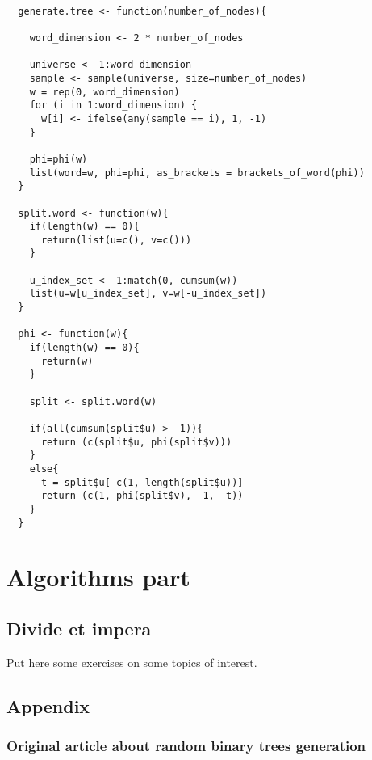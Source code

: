 \documentclass[twoside,openright,titlepage,fleqn,
	headinclude,11pt,a4paper,BCOR5mm,footinclude
	]{scrbook}
\begin{document}
\begin{lstlisting}

  generate.tree <- function(number_of_nodes){

    word_dimension <- 2 * number_of_nodes
    
    universe <- 1:word_dimension
    sample <- sample(universe, size=number_of_nodes)
    w = rep(0, word_dimension)
    for (i in 1:word_dimension) {
      w[i] <- ifelse(any(sample == i), 1, -1)
    }
    
    phi=phi(w)
    list(word=w, phi=phi, as_brackets = brackets_of_word(phi))
  }

  split.word <- function(w){
    if(length(w) == 0){
      return(list(u=c(), v=c()))
    }
    
    u_index_set <- 1:match(0, cumsum(w))
    list(u=w[u_index_set], v=w[-u_index_set])
  }

  phi <- function(w){
    if(length(w) == 0){
      return(w)
    }
    
    split <- split.word(w) 
    
    if(all(cumsum(split$u) > -1)){
      return (c(split$u, phi(split$v)))
    }
    else{
      t = split$u[-c(1, length(split$u))]
      return (c(1, phi(split$v), -1, -t))
    }
  }
\end{lstlisting}

\part{Algorithms part}

\chapter{Divide et impera}
Put here some exercises on some topics of interest.

\chapter{Appendix}

\section{Original article about random binary trees generation}



% 
\end{document}
